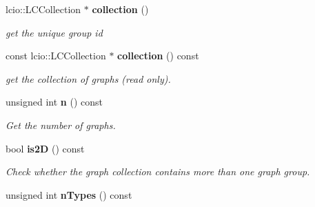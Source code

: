\begin{DoxyCompactItemize}
\item 
lcio::LCCollection $\ast$ {\bf collection} ()
\begin{DoxyCompactList}\small\item\em get the unique group id \item\end{DoxyCompactList}\item 
const lcio::LCCollection $\ast$ {\bf collection} () const 
\begin{DoxyCompactList}\small\item\em get the collection of graphs (read only). \item\end{DoxyCompactList}\item 
unsigned int {\bf n} () const 
\begin{DoxyCompactList}\small\item\em Get the number of graphs. \item\end{DoxyCompactList}\item 
bool {\bf is2D} () const 
\begin{DoxyCompactList}\small\item\em Check whether the graph collection contains more than one graph group. \item\end{DoxyCompactList}\item 
unsigned int {\bfseries nTypes} () const \label{classhistmgr_1_1GraphCollection__t_aa2092b41bf92f55d260e754ff26e48f2}


\end{DoxyCompactItemize}
